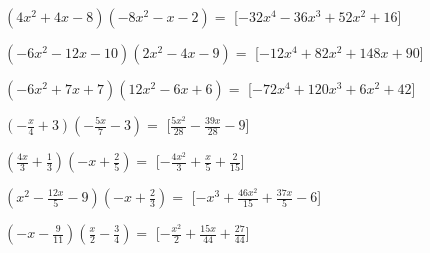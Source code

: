 \begin{esercizio}
\begin{enumeratea}
\item \(\left(4 x^{2} + 4 x - 8\right)\left(- 8 x^{2} - x - 2\right)=\) 
  \hfill [\(- 32 x^{4} - 36 x^{3} + 52 x^{2} + 16\)]
\item \(\left(- 6 x^{2} - 12 x - 10\right)\left(2 x^{2} - 4 x - 9\right)=\) 
  \hfill [\(- 12 x^{4} + 82 x^{2} + 148 x + 90\)]
\item \(\left(- 6 x^{2} + 7 x + 7\right)\left(12 x^{2} - 6 x + 6\right)=\) 
  \hfill [\(- 72 x^{4} + 120 x^{3} + 6 x^{2} + 42\)]
\item \(\left(- \frac{x}{4} + 3\right)\left(- \frac{5 x}{7} - 3\right)=\)
  \hfill [\(\frac{5 x^{2}}{28} - \frac{39 x}{28} - 9\)]
\item \(\left(\frac{4 x}{3} + \frac{1}{3}\right)\left(- x + 
\frac{2}{5}\right)=\)
  \hfill [\(- \frac{4 x^{2}}{3} + \frac{x}{5} + \frac{2}{15}\)]
\item \(\left(x^{2} - \frac{12 x}{5} - 9\right)\left(- x + 
\frac{2}{3}\right)=\)
  \hfill [\(- x^{3} + \frac{46 x^{2}}{15} + \frac{37 x}{5} - 6\)]
\item \(\left(- x - \frac{9}{11}\right)\left(\frac{x}{2} - 
\frac{3}{4}\right)=\)
  \hfill [\(- \frac{x^{2}}{2} + \frac{15 x}{44} + \frac{27}{44}\)]

\end{enumeratea}
\end{esercizio}

